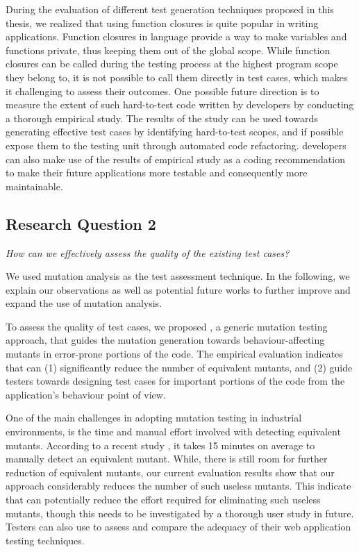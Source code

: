  During the evaluation of different test generation techniques proposed in this thesis, we realized that using function closures is quite popular in writing \javascript applications. 
Function closures in \javascript language provide a way to make variables and functions private, thus keeping them out of the global scope.
While function closures can be called during the testing process at the highest program scope they belong to, it is not possible to call them directly in test cases, which makes it challenging to assess their outcomes.
One possible future direction is to measure the extent of such hard-to-test code written by developers by conducting a thorough empirical study.
The results of the study can be used towards generating effective test cases by identifying hard-to-test scopes, and if possible expose them to the testing unit through automated code refactoring. \javascript developers can also make use of the results of empirical study as a coding recommendation to make their future applications more testable and consequently more maintainable.

\subsection{Research Question 2}

\emph{How can we effectively assess the quality of the existing \javascript test cases?}

We used mutation analysis as the test assessment technique. In the following, we explain our observations as well as potential future works to further improve and expand the use of mutation analysis. 

 To assess the quality of test cases, we proposed \mutandis, a generic mutation testing approach, that guides the mutation generation towards behaviour-affecting mutants in error-prone portions of the code. The empirical evaluation indicates that \mutandis can (1) significantly reduce the number of equivalent mutants, and (2) guide testers towards designing test cases for important portions of the code from the application's behaviour point of view. 

One of the main challenges in adopting mutation testing in industrial environments, is the time and manual effort involved with detecting equivalent mutants. According to a recent study \cite{madeyski:tse13}, it takes 15 minutes on average to manually detect an equivalent mutant. While, there is still room for further reduction of equivalent mutants, our current evaluation results show that our approach considerably reduces the number of such useless mutants. This indicate that \mutandis can potentially reduce the effort required for eliminating such useless mutants, though this needs to be investigated by a thorough user study in future.
Testers can also use \mutandis to assess and compare the adequacy of their web application testing techniques.  

